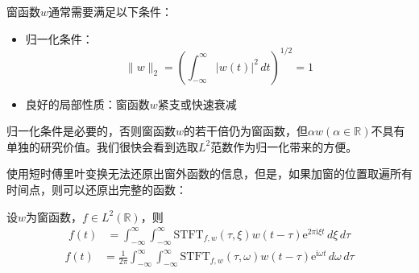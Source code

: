 \documentclass{ctexbook}
\begin{document}
窗函数$w$通常需要满足以下条件：
\begin{itemize}
    \item 归一化条件：
    \[\|w\|_2=\left(\int_{-\infty}^{\infty}|w(t)|^2\,dt\right)^{1/2}=1\]
    \item 良好的局部性质：窗函数$w$紧支或快速衰减
\end{itemize}

归一化条件是必要的，否则窗函数$w$的若干倍仍为窗函数，但$\alpha w(\alpha\in\mathbb{R})$不具有单独的研究价值。我们很快会看到选取$L^2$范数作为归一化带来的方便。

使用短时傅里叶变换无法还原出窗外函数的信息，但是，如果加窗的位置取遍所有时间点，则可以还原出完整的函数：

\begin{theorem}[短时傅里叶反演公式]
    设$w$为窗函数，$f\in L^2(\mathbb{R})$，则
    {\color{blue}\begin{align*}
        f(t)&=\int_{-\infty}^{\infty}\int_{-\infty}^{\infty}\mathrm{STFT} _{f,w}(\tau,\xi)w(t-\tau)\mathrm{e}^{2\pi \mathrm{i} \xi t}\,d\xi\,d\tau
    \end{align*}}
    {\color{red}\begin{align*}
        f(t)&=\frac{1}{2\pi}\int_{-\infty}^{\infty}\int_{-\infty}^{\infty}\mathrm{STFT} _{f,w}(\tau,\omega)w(t-\tau)\mathrm{e}^{\mathrm{i} \omega t}\,d\omega\,d\tau
    \end{align*}}
\end{theorem}
\end{document}
